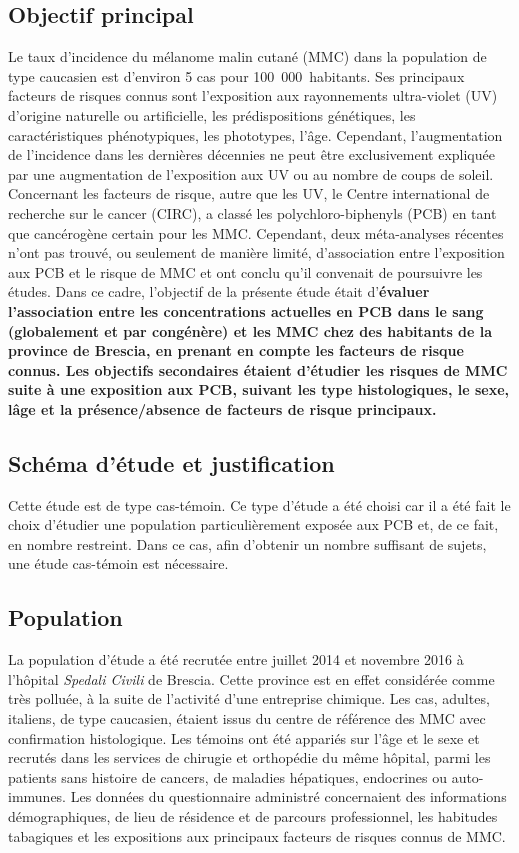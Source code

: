 \documentclass[10pt]{article}
\begin{document}
\subsection{Objectif principal}
Le taux d'incidence du mélanome malin cutané (MMC) dans la population de type caucasien est d'environ 5 cas pour 100~000~habitants. Ses principaux facteurs de risques connus sont l'exposition aux rayonnements ultra-violet (UV) d'origine naturelle ou artificielle, les prédispositions génétiques, les caractéristiques phénotypiques, les phototypes, l'âge. Cependant, l'augmentation de l'incidence dans les dernières décennies ne peut être exclusivement expliquée par une augmentation de l'exposition aux UV ou au nombre de coups de soleil. Concernant les facteurs de risque, autre que les UV, le Centre international de recherche sur le cancer (CIRC), a classé les polychloro-biphenyls (PCB) en tant que cancérogène certain pour les MMC.
Cependant, deux méta-analyses récentes n'ont pas trouvé, ou seulement de manière limité, d'association entre l'exposition aux PCB et le risque de MMC et ont conclu qu'il convenait de poursuivre les études. Dans ce cadre, l'objectif de la présente étude était d'\textbf{évaluer l'association entre les concentrations actuelles en PCB dans le sang (globalement et par congénère) et les MMC chez des habitants de la province de Brescia, en prenant en compte les facteurs de risque connus. Les objectifs secondaires étaient d'étudier les risques de MMC suite à une exposition aux PCB, suivant les type histologiques, le sexe, lâge et la présence/absence de facteurs de risque principaux.}

\subsection{Schéma d'étude et justification}
Cette étude est de type cas-témoin. Ce type d'étude a été choisi car il a été fait le choix d'étudier une population particulièrement exposée aux PCB et, de ce fait, en nombre restreint. Dans ce cas, afin d'obtenir un nombre suffisant de sujets, une étude cas-témoin est nécessaire. 

\subsection{Population}
La population d'étude a été recrutée entre juillet 2014 et novembre 2016 à l'hôpital \emph{Spedali Civili} de Brescia. Cette province est en effet considérée comme très polluée, à la suite de l'activité d'une entreprise chimique. Les cas, adultes, italiens, de type caucasien, étaient issus du centre de référence des MMC avec confirmation histologique. Les témoins ont été appariés sur l'âge et le sexe et recrutés dans les services de chirugie et orthopédie du même hôpital, parmi les patients sans histoire de cancers, de maladies hépatiques, endocrines ou auto-immunes. Les données du questionnaire administré concernaient des informations démographiques, de lieu de résidence et de parcours professionnel, les habitudes tabagiques et les expositions aux principaux facteurs de risques connus de MMC.
\end{document}

